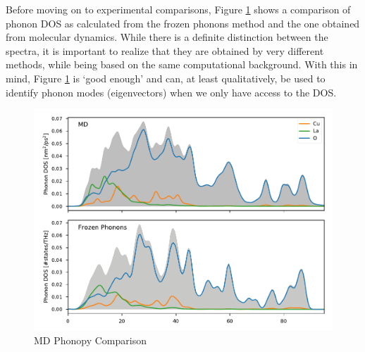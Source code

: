 Before moving on to experimental comparisons, Figure \ref{fig:md_phonopy_comparison} shows a comparison of phonon DOS as calculated from the frozen phonons method and the one obtained from molecular dynamics. While there is a definite distinction between the spectra, it is important to realize that they are obtained by very different methods, while being based on the same computational background. With this in mind, Figure \ref{fig:md_phonopy_comparison} is `good enough' and can, at least qualitatively, be used to identify phonon modes (eigenvectors) when we only have access to the DOS.

\begin{figure}
	\centering
	\includegraphics[width=\textwidth]{fig/md/md_phonopy_comparison.pdf}
	\caption[MD Phonopy Comparison]{MD Phonopy Comparison}
	\label{fig:md_phonopy_comparison}
\end{figure}


